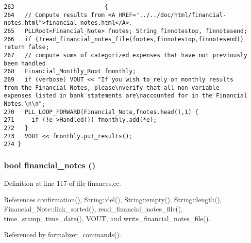 \footnotesize\begin{verbatim}263                          {
264   // Compute results from <A HREF="../../doc/html/financial-notes.html">financial-notes.html</A>.
265   PLLRoot<Financial_Note> fnotes; String finnotestop, finnotesend;
266   if (!read_financial_notes_file(fnotes,finnotestop,finnotesend)) return false;
267   // compute sums of categorized expenses that have not previously been handled
268   Financial_Monthly_Root fmonthly;
269   if (verbose) VOUT << "If you wish to rely on monthly results from the Financial Notes, please\nverify that all non-variable expenses listed in bank statements are\naccounted for in the Financial Notes.\n\n";
270   PLL_LOOP_FORWARD(Financial_Note,fnotes.head(),1) {
271     if (!e->Handled()) fmonthly.add(*e);
272   }
273   VOUT << fmonthly.put_results();
274 }
\end{verbatim}\normalsize 
{}
\subsubsection{\setlength{\rightskip}{0pt plus 5cm}bool financial\_\-notes ()}\label{dil2al_8hh_a369}




Definition at line 117 of file finances.cc.

References confirmation(), String::del(), String::empty(), String::length(), Financial\_\-Note::link\_\-sorted(), read\_\-financial\_\-notes\_\-file(), time\_\-stamp\_\-time\_\-date(), VOUT, and write\_\-financial\_\-notes\_\-file().

Referenced by formalizer\_\-commands().



